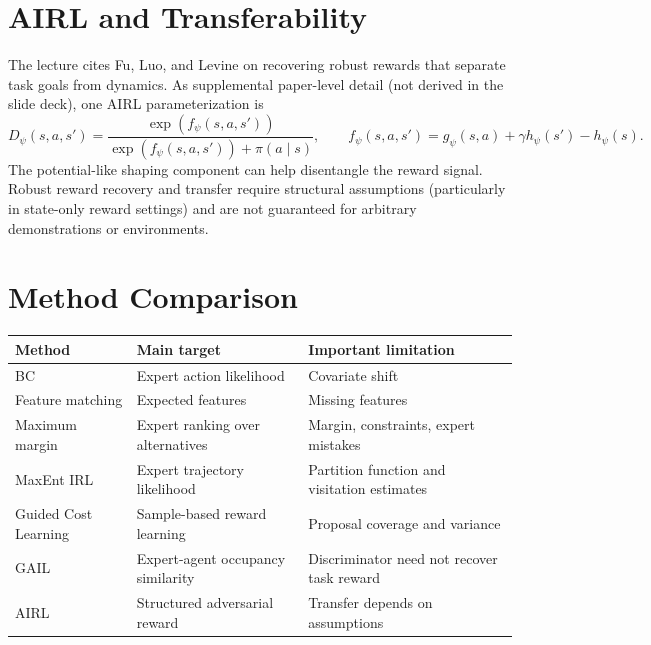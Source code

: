 \section{AIRL and Transferability}
The lecture cites Fu, Luo, and Levine on recovering robust rewards that separate task goals from dynamics. As supplemental paper-level detail (not derived in the slide deck), one AIRL parameterization is
\[
D_\psi(s,a,s')=\frac{\exp(f_\psi(s,a,s'))}{\exp(f_\psi(s,a,s'))+\pi(a\mid s)},
\qquad
f_\psi(s,a,s')=g_\psi(s,a)+\gamma h_\psi(s')-h_\psi(s).
\]
The potential-like shaping component can help disentangle the reward signal. Robust reward recovery and transfer require structural assumptions (particularly in state-only reward settings) and are not guaranteed for arbitrary demonstrations or environments.

\section{Method Comparison}
\begin{center}\small
\begin{tabularx}{\textwidth}{@{}p{}X X@{}}\toprule
Method & Main target & Important limitation\\\midrule
BC & Expert action likelihood & Covariate shift\\
Feature matching & Expected features & Missing features\\
Maximum margin & Expert ranking over alternatives & Margin, constraints, expert mistakes\\
MaxEnt IRL & Expert trajectory likelihood & Partition function and visitation estimates\\
Guided Cost Learning & Sample-based reward learning & Proposal coverage and variance\\
GAIL & Expert-agent occupancy similarity & Discriminator need not recover task reward\\
AIRL & Structured adversarial reward & Transfer depends on assumptions\\\bottomrule
\end{tabularx}
\end{center}

